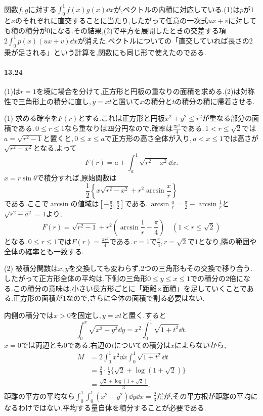関数$f,g$に対する$\int_0^1f(x)g(x)\dd x$が,ベクトルの内積に対応している.(1)は$p$が$1$と$x$のそれぞれに直交することに当たり,したがって任意の一次式$ux+v$に対しても積の積分が$0$になる.その結果,(2)で平方を展開したときの交差する項$2\int_0^1p(x)(ux+v)\dd x$が消えた.ベクトルについての「直交していれば長さの2乗が足される」という計算を,関数にも同じ形で使えたのである.

\paragraph{13.24}
(1)は$r=1$を境に場合を分けて,正方形と円板の重なりの面積を求める.(2)は対称性で三角形上の積分に直し,\,$y=xt$と置いて$x$の積分と$t$の積分の積に帰着させる.

(1) 求める確率を$F(r)$とする.これは正方形と円板$x^2+y^2\le r^2$が重なる部分の面積である.\,$0\le r\le1$なら重なりは四分円なので,確率は$\frac{\pi r^2}{4}$である.\,$1<r\le\sqrt2$では$a=\sqrt{r^2-1}$と置くと,\,$0\le x\le a$で正方形の高さ全体が入り,\,$a<x\le1$では高さが$\sqrt{r^2-x^2}$となる.よって
\[
 F(r)=a+\int_a^1\sqrt{r^2-x^2}\dd x.
\]
$x=r\sin\theta$で積分すれば,原始関数は
\[
 \frac12\left\{x\sqrt{r^2-x^2}+r^2\arcsin\frac xr\right\}
\]
である.ここで$\arcsin$の値域は$\left[-\frac\pi2,\frac\pi2\right]$である.\,$\arcsin\frac ar=\frac\pi2-\arcsin\frac1r$と$\sqrt{r^2-a^2}=1$より,
\[
 \boxed{F(r)=\sqrt{r^2-1}+r^2\left(\arcsin\frac1r-\frac\pi4\right)}
 \quad(1<r\le\sqrt2)
\]
となる.\,$0\le r\le1$では$\boxed{F(r)=\frac{\pi r^2}{4}}$である.\,$r=1$で$\frac\pi4$,\,$r=\sqrt2$で$1$となり,隣の範囲や全体の確率とも一致する.

(2) 被積分関数は$x,y$を交換しても変わらず,2つの三角形もその交換で移り合う.したがって正方形全体の平均は,下側の三角形$0\le y\le x\le1$での積分の$2$倍になる.この積分の意味は,小さい長方形ごとに「距離$\times$面積」を足していくことである.正方形の面積が$1$なので,さらに全体の面積で割る必要はない.

内側の積分では$x>0$を固定し,\,$y=xt$と置く.すると
\[
 \int_0^x\sqrt{x^2+y^2}\dd y
 =x^2\int_0^1\sqrt{1+t^2}\dd t.
\]
$x=0$では両辺とも$0$である.右辺の$t$についての積分は$x$によらないから,
\[
 \begin{aligned}
 M&=2\int_0^1x^2\dd x\int_0^1\sqrt{1+t^2}\dd t\\
 &=\frac23\cdot\frac12\{\sqrt2+\log(1+\sqrt2)\}\\
 &=\boxed{\frac{\sqrt2+\log(1+\sqrt2)}3}.
 \end{aligned}
\]
距離の平方の平均なら$\int_0^1\int_0^1(x^2+y^2)\dd y\dd x=\frac23$だが,その平方根が距離の平均になるわけではない.平均する量自体を積分することが必要である.
